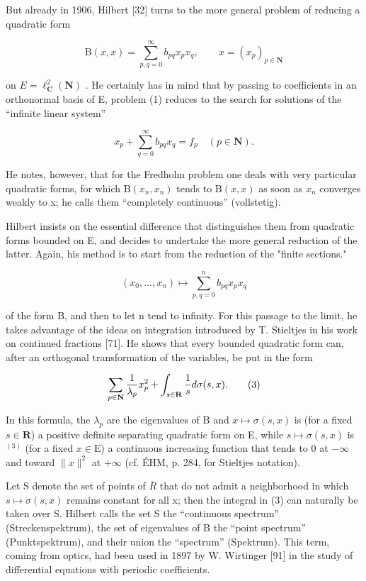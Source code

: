 But already in 1906, Hilbert [32] turns to the more general problem of reducing a quadratic form

\[
\mathrm{B} (x, x) = \sum_ {p, q = 0} ^ {\infty} b _ {p q} x _ {p} x _ {q}, \qquad x = (x _ {p}) _ {p \in \mathbf {N}}
\]

on \(E = \ell_{\mathbf{C}}^{2}(\mathbf{N})\) . He certainly has in mind that by passing to coefficients in an orthonormal basis of E, problem (1) reduces to the search for solutions of the “infinite linear system”

\[
x _ {p} + \sum_ {q = 0} ^ {\infty} b _ {p q} x _ {q} = f _ {p} \quad (p \in \mathbf {N}).
\]

He notes, however, that for the Fredholm problem one deals with very particular quadratic forms, for which \(\mathrm{B}(x_{n}, x_{n})\) tends to \(\mathrm{B}(x, x)\) as soon as \(x_{n}\) converges weakly to x; he calls them “completely continuous” (vollstetig).

Hilbert insists on the essential difference that distinguishes them from quadratic forms bounded on E, and decides to undertake the more general reduction of the latter. Again, his method is to start from the reduction of the "finite sections."

\[
(x _ {0}, \ldots , x _ {n}) \mapsto \sum_ {p, q = 0} ^ {n} b _ {p q} x _ {p} x _ {q}
\]

of the form B, and then to let n tend to infinity. For this passage to the limit, he takes advantage of the ideas on integration introduced by T. Stieltjes in his work on continued fractions [71]. He shows that every bounded quadratic form can, after an orthogonal transformation of the variables, be put in the form

\[
\sum_ {p \in {\bf N}} \frac {1}{\lambda_ {p}} x _ {p} ^ {2} + \int_ {s \in {\bf R}} \frac {1}{s} d \sigma (s, x).\tag{3}
\]

In this formula, the \(\lambda_{p}\) are the eigenvalues of B and \(x\mapsto\sigma(s,x)\) is (for a fixed \(s\in\mathbf{R}\)) a positive definite separating quadratic form on E, while \(s\mapsto\sigma(s,x)\) is \(^{(3)}\) (for a fixed \(x\in\mathrm{E}\)) a continuous increasing function that tends to 0 at \(-\infty\) and toward \(\|x\|^2\) at \(+\infty\) (cf. ÉHM, p. 284, for Stieltjes notation).

Let S denote the set of points of \(\overline{R}\) that do not admit a neighborhood in which \(s \mapsto \sigma(s, x)\) remains constant for all x; then the integral in (3) can naturally be taken over S. Hilbert calls the set S the “continuous spectrum” (Streckenspektrum), the set of eigenvalues of B the “point spectrum” (Punktspektrum), and their union the “spectrum” (Spektrum). This term, coming from optics, had been used in 1897 by W. Wirtinger [91] in the study of differential equations with periodic coefficients.

